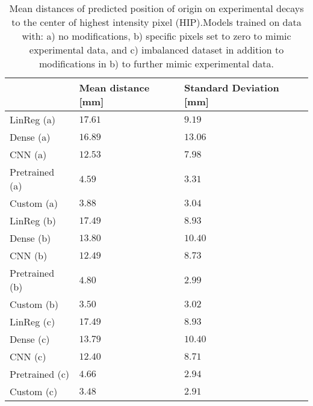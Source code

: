 \begin{table}
\centering
\caption{
Mean distances of predicted position of origin on experimental decays to the center of highest intensity pixel (HIP).Models 
trained on data with: a) no modifications, b) specific pixels set to zero to mimic experimental data, and c) imbalanced dataset
in addition to modifications in b) to further mimic experimental data.
}
\label{tab:regression-experimental-dist-means}
\begin{tabular}{lll}
\toprule
{} & Mean distance [mm] & Standard Deviation [mm] \\
\midrule
LinReg (a)     &  $\num{ 17.61 }$ &  $\num{ 9.19 }$ \\
Dense (a)      &  $\num{ 16.89 }$ &  $\num{ 13.06 }$ \\
CNN (a)        &  $\num{ 12.53 }$ &  $\num{ 7.98 }$ \\
Pretrained (a) &  $\num{ 4.59 }$ &  $\num{ 3.31 }$ \\
Custom (a)     &  $\num{ 3.88 }$ &  $\num{ 3.04 }$ \\
LinReg (b)     &  $\num{ 17.49 }$ &  $\num{ 8.93 }$ \\
Dense (b)      &  $\num{ 13.80 }$ &  $\num{ 10.40 }$ \\
CNN (b)        &  $\num{ 12.49 }$ &  $\num{ 8.73 }$ \\
Pretrained (b) &  $\num{ 4.80 }$ &  $\num{ 2.99 }$ \\
Custom (b)     &  $\num{ 3.50 }$ &  $\num{ 3.02 }$ \\
LinReg (c)     &  $\num{ 17.49 }$ &  $\num{ 8.93 }$ \\
Dense (c)      &  $\num{ 13.79 }$ &  $\num{ 10.40 }$ \\
CNN (c)        &  $\num{ 12.40 }$ &  $\num{ 8.71 }$ \\
Pretrained (c) &  $\num{ 4.66 }$ &  $\num{ 2.94 }$ \\
Custom (c)     &  $\num{ 3.48 }$ &  $\num{ 2.91 }$ \\
\bottomrule
\end{tabular}
\end{table}
